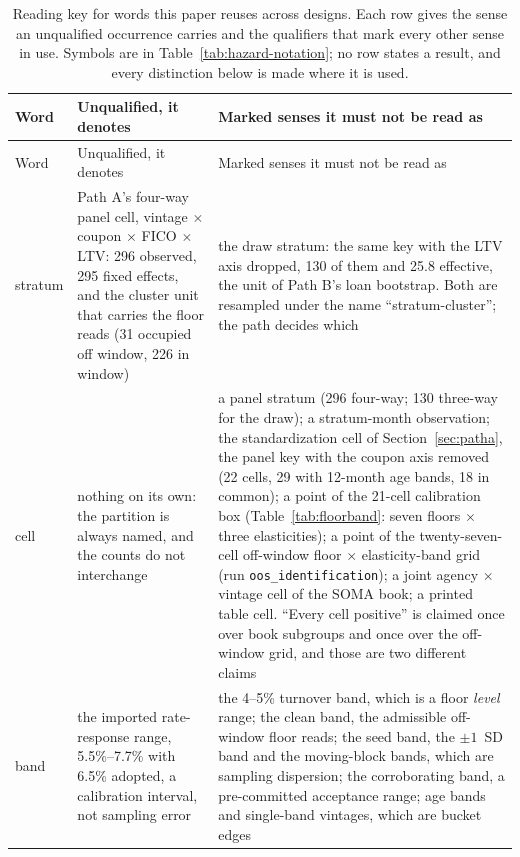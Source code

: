 \documentclass[12pt]{article}
\begin{document}
\begin{table}[H]
\begin{threeparttable}
\begin{tablenotes}[flushleft]
\end{tablenotes}
\end{threeparttable}
\end{table}

{\footnotesize
\begin{longtable}{@{}p{1.5cm}p{6.2cm}p{6.2cm}@{}}
\caption{Reading key for words this paper reuses across designs. Each row gives the sense an unqualified occurrence carries and the qualifiers that mark every other sense in use. Symbols are in Table~\ref{tab:hazard-notation}; no row states a result, and every distinction below is made where it is used.}
\label{tab:terminology}\\
\toprule
Word & Unqualified, it denotes & Marked senses it must not be read as \\
\midrule
\endfirsthead
\toprule
Word & Unqualified, it denotes & Marked senses it must not be read as \\
\midrule
\endhead
stratum & Path A's four-way panel cell, vintage $\times$ coupon $\times$ FICO $\times$ LTV: 296 observed, 295 fixed effects, and the cluster unit that carries the floor reads (31 occupied off window, 226 in window) & the draw stratum: the same key with the LTV axis dropped, 130 of them and 25.8 effective, the unit of Path B's loan bootstrap. Both are resampled under the name ``stratum-cluster''; the path decides which \\
cell & nothing on its own: the partition is always named, and the counts do not interchange & a panel stratum (296 four-way; 130 three-way for the draw); a stratum-month observation; the standardization cell of Section~\ref{sec:patha}, the panel key with the coupon axis removed (22 cells, 29 with 12-month age bands, 18 in common); a point of the 21-cell calibration box (Table~\ref{tab:floorband}: seven floors $\times$ three elasticities); a point of the twenty-seven-cell off-window floor $\times$ elasticity-band grid (run \texttt{oos\_identification}); a joint agency $\times$ vintage cell of the SOMA book; a printed table cell. ``Every cell positive'' is claimed once over book subgroups and once over the off-window grid, and those are two different claims \\
band & the imported rate-response range, 5.5\%--7.7\% with 6.5\% adopted, a calibration interval, not sampling error & the 4--5\% turnover band, which is a floor \emph{level} range; the clean band, the admissible off-window floor reads; the seed band, the $\pm 1$~SD band and the moving-block bands, which are sampling dispersion; the corroborating band, a pre-committed acceptance range; age bands and single-band vintages, which are bucket edges \\

\end{longtable}}
\end{document}
